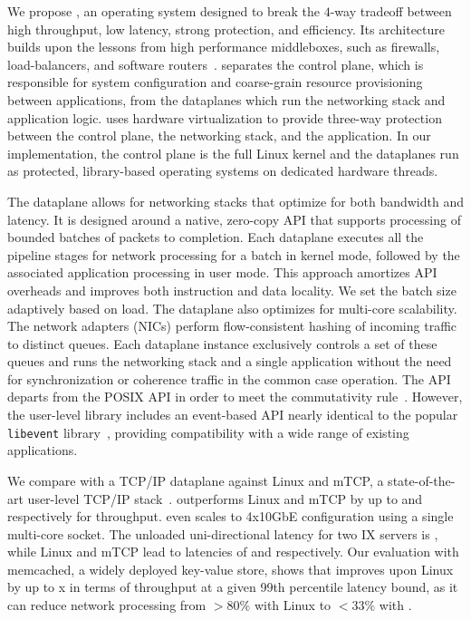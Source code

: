 We propose \ix, an operating system designed to break the $4$-way
tradeoff between high throughput, low latency, strong protection, and
efficiency. Its architecture builds upon the lessons from high
performance middleboxes, such as firewalls, load-balancers, and
software routers~\cite{routebricks,click}. \ix separates the control
plane, which is responsible for system configuration and coarse-grain
resource provisioning between applications, from the dataplanes which
run the networking stack and application logic. \ix uses hardware
virtualization%
to
provide three-way protection between the control plane, the networking
stack, and the application. In our implementation, the control plane
is the full Linux kernel and the dataplanes run as protected,
library-based operating systems on dedicated hardware threads.

The \ix dataplane allows for networking stacks that optimize for both
bandwidth and latency. It is designed around a native, zero-copy API
that supports processing of bounded batches of packets to
completion. Each dataplane executes all the pipeline stages for
network processing for a batch in kernel mode, followed by the
associated application processing in user mode. This approach
amortizes API overheads and improves both instruction and data
locality. We set the batch size adaptively based on load. The \ix
dataplane also optimizes for multi-core scalability.  The network
adapters (NICs) perform flow-consistent hashing of incoming traffic to
distinct queues. Each dataplane instance exclusively controls a set of
these queues and runs the networking stack and a single application
without the need for synchronization or coherence traffic in the
common case operation. The \ix API departs from the POSIX API in order
to meet the commutativity rule~\cite{DBLP:conf/sosp/ClementsKZMK13}.
However, the \ix user-level library includes an event-based API nearly
identical to the popular \texttt{libevent}
library~\cite{provos2003libevent}, providing compatibility with a wide
range of existing applications.

We compare \ix with a TCP/IP dataplane against Linux
 and mTCP, a state-of-the-art user-level TCP/IP
stack~\cite{jeong2014mtcp}.  \ix outperforms Linux and mTCP by up to
 and  respectively for throughput. \ix
even scales to 4x10GbE configuration using a single multi-core socket.
The unloaded uni-directional latency for two IX servers is
\microsecond, while Linux and mTCP lead to latencies of
\microsecond and \microsecond respectively.
Our evaluation with memcached, a widely deployed key-value store,
shows that \ix improves upon Linux by up to x in terms
of throughput at a given 99th percentile latency bound, as it can
reduce network processing from $>80\%$ with Linux to $<33\%$ with \ix.

